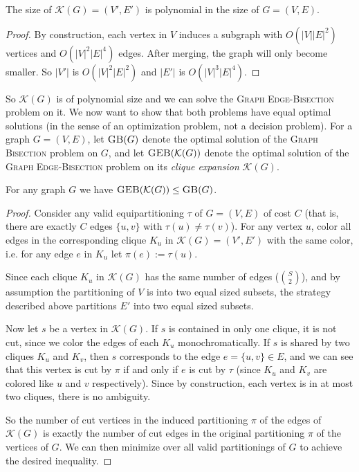 \documentclass{article}
\newcommand{\gb}{\textsc{Graph \allowbreak Bisection} }
\newcommand{\geb}{\textsc{Graph \allowbreak Edge-\allowbreak Bisection} }
\newcommand{\sgeb}{\textsc{GEB} }
\newcommand{\sgb}{\textsc{GB} }
\begin{document}
	\begin{proposition}
		\label{poly-size}
		The size of $\mathcal{K}(G) = (V', E')$ is polynomial in the size of
		$G = (V, E)$.
	\end{proposition}
	\begin{proof}
		By construction, each vertex in $V$ induces a subgraph with
		$O(|V||E|^2)$
		vertices and $O(|V|^2|E|^4)$ edges. After merging, the graph will only
		become smaller. So $|V'|$ is $O(|V|^2 |E|^2)$ and $|E'|$ is
		$O(|V|^3|E|^4)$.
	\end{proof}

	So $\mathcal{K}(G)$ is of polynomial size and we can solve the \geb problem
	on it. We now want to show that both problems have equal optimal solutions
	(in the sense of an optimization problem, not a decision problem). For
	a graph $G=(V, E)$, let $\sgb(G)$ denote the optimal solution of the \gb
	problem on $G$, and let $\sgeb(\mathcal{K}(G))$ denote the optimal solution
	of the \geb problem on its \textit{clique expansion} $\mathcal{K}(G)$.

	\begin{proposition}
		\label{geb-leq-gb}
		For any graph $G$ we have $\sgeb(\mathcal{K}(G)) \leq \sgb(G)$.
	\end{proposition}
	\begin{proof}
		Consider any valid equipartitioning $\tau$ of $G = (V, E)$ of cost
		$C$ (that is, there are
		exactly $C$ edges $\{u, v\}$ with $\tau(u) \neq \tau(v)$).
		For any vertex $u$,
		color all edges in the corresponding clique $K_u$ in $\mathcal{K}(G)
			= (V', E')$ with the same color, i.e. for any edge $e$ in $K_u$
		let $\pi(e) := \tau(u)$.

		Since each clique $K_u$ in $\mathcal{K}(G)$ has the same number of
		edges ($\binom{S}{2}$), and by
		assumption the partitioning of $V$ is into two equal sized subsets, the
		strategy described above partitions $E'$ into two equal sized subsets.

		Now let $s$ be a vertex in $\mathcal{K}(G)$. If $s$ is contained in
		only one clique, it is not cut,
		since we color the edges of
		each $K_u$ monochromatically. If $s$ is shared by two
		cliques $K_u$ and $K_v$, then $s$ corresponds to the edge
		$e = \{u, v\} \in E$, and
		we can see that this vertex is cut by $\pi$
		if and only if $e$ is cut by $\tau$ (since $K_u$ and
		$K_v$ are colored like $u$ and $v$ respectively).
		Since by construction,
		each vertex is in at most two cliques, there is no ambiguity.

		So the number of cut vertices in the induced partitioning $\pi$ of the
		edges of
		$\mathcal{K}(G)$ is exactly the number of cut edges in the original
		partitioning $\pi$ of the vertices of $G$. We can then minimize
		over all valid partitionings of $G$ to achieve the desired inequality.
	\end{proof}
\end{document}
